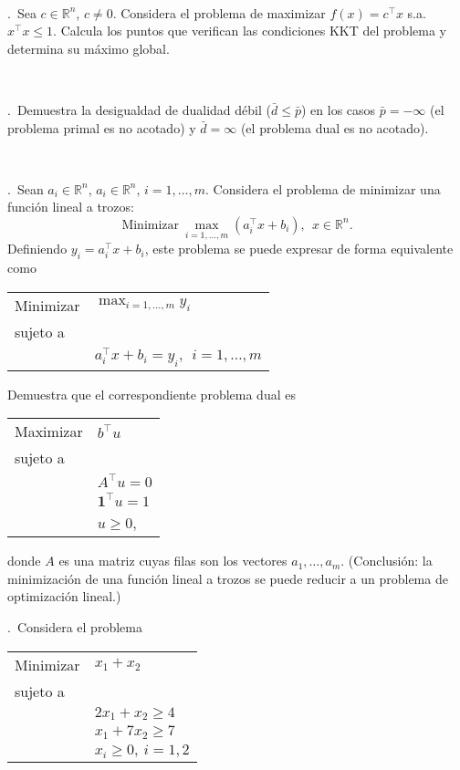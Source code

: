 \documentclass[12pt,a4paper,twoside]{article}
\newcounter{problem} \setcounter{problem}{1}
\newcommand{\ex}{\noindent {\sf \bf \theproblem}\addtocounter{problem}{1}.\ }
\begin{document}
\

\ex Sea $c\in\mathbb{R}^n$, $c\neq 0$. Considera el problema de maximizar $f(x)=c^\top x$ s.a. $x^\top x\leq 1$. Calcula los puntos que verifican las condiciones KKT del problema y determina su máximo global. 




\


\ex Demuestra la desigualdad de dualidad débil ($\bar{d}\leq \bar{p}$) en los casos $\bar{p}=-\infty$ (el problema primal es no acotado) y $\bar{d}=\infty$ (el problema dual es no acotado).

\


\ex Sean $a_i\in\mathbb{R}^n$, $a_i\in\mathbb{R}^n$, $i=1,\ldots,m$. Considera el problema de minimizar una función lineal a trozos:
\[
\mbox{Minimizar}\ \max_{i=1,\ldots,m} (a_i^\top x + b_i),\ \ x\in\mathbb{R}^n.
\]
Definiendo $y_i=a_i^\top x + b_i$, este problema se puede expresar de forma equivalente como
\begin{center}
\begin{tabular}{ll}
Minimizar & $\displaystyle{\max_{i=1,\ldots,m}} y_i$ \\
sujeto a & \\
& $a_i^\top x + b_i=y_i,\ \ i=1,\ldots,m$
\end{tabular}
\end{center}
Demuestra que el correspondiente problema dual es
\begin{center}
\begin{tabular}{ll}
Maximizar & $b^\top u$ \\
sujeto a & \\
& $A^\top u=0$ \\
& $\mathbf{1}^\top u = 1$\\
& $u\geq 0$,
 \end{tabular}
\end{center}
donde $A$ es una matriz cuyas filas son los vectores $a_1,\ldots,a_m$.
(Conclusión: la minimización de una función lineal a trozos se puede reducir a un problema de optimización lineal.)








\newpage

\ex  Considera el problema
\begin{center}
\begin{tabular}{ll}
Minimizar & $x_1 + x_2$ \\
sujeto a & \\
& $2x_1 + x_2 \geq 4$\\
& $x_1+7x_2 \geq 7$\\
&$x_i\geq 0,\ i=1,2$
\end{tabular}
\end{center}
\end{document}
